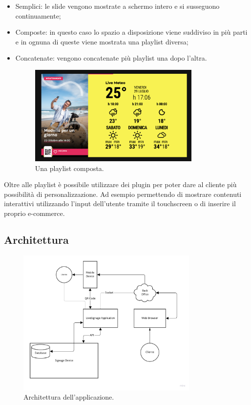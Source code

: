 \begin{itemize}
    \item Semplici: le slide vengono mostrate a schermo intero e si susseguono continuamente;
    \item Composte: in questo caso lo spazio a disposizione viene suddiviso in più parti e in ognuna di queste viene mostrata una playlist diversa;
    \item Concatenate: vengono concatenate più playlist una dopo l'altra.
    \begin{figure}[!htb]
        \centering
        \includegraphics[width= 0.8\textwidth]{images/Introduzione/playlist-composta.png} 
        \caption{Una playlist composta.} 
    \end{figure}
\end{itemize}


Oltre alle playlist è possibile utilizzare dei plugin per poter dare al cliente più possibilità di personalizzazione. Ad esempio permettendo di  mostrare contenuti interattivi utilizzando l'input dell'utente tramite il touchscreen o di inserire il proprio e-commerce.

\subsection{Architettura}
\begin{figure}[!htb]
    \centering
    \includegraphics[width= 0.8\textwidth]{images/Introduzione/architettura.jpg} 
    \caption{Architettura dell'applicazione.} 
    \label{fig:architettura}
\end{figure}


